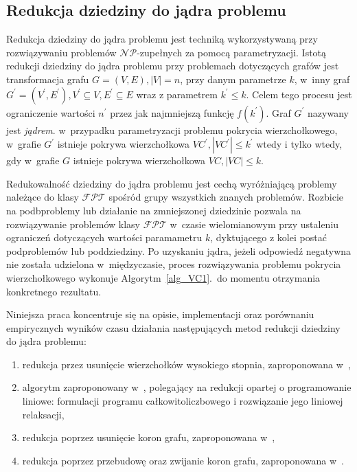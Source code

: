 \subsection{Redukcja dziedziny do jądra problemu}\label{subsection_kernelization}
\par{
  Redukcja dziedziny do jądra problemu jest techniką wykorzystywaną przy
  rozwiązywaniu problemów $\mathcal{NP}$-zupełnych za pomocą parametryzacji.
  Istotą redukcji dziedziny do jądra problemu przy problemach dotyczących grafów
  jest transformacja grafu $G=(V,E), |V|=n$, przy danym parametrze $k$, w~inny
  graf $G^{\prime}=(V^{\prime}, E^{\prime}), V^{\prime} \subseteq V, E^{\prime} \subseteq E$
  wraz z parametrem $k^{\prime} \leq k$.
  Celem tego procesu jest ograniczenie wartości $n^{\prime}$ przez jak najmniejszą
  funkcję $f(k^{\prime})$.
  Graf $G^{\prime}$ nazywany jest \emph{jądrem}.
  w~przypadku parametryzacji problemu pokrycia wierzchołkowego, w~grafie
  $G^{\prime}$ istnieje pokrywa wierzchołkowa $VC^{\prime}, |VC^{\prime}|\leq k^{\prime}$ 
  wtedy i tylko wtedy, gdy w~grafie $G$ istnieje pokrywa wierzchołkowa $VC,
  |VC| \leq k$.
}
\par{
  Redukowalność dziedziny do jądra problemu jest cechą wyróżniającą problemy 
  należące do klasy $\mathcal{FPT}$ spośród grupy wszystkich znanych problemów.
  Rozbicie na podbproblemy lub działanie na zmniejszonej dziedzinie pozwala na
  rozwiązywanie problemów klasy $\mathcal{FPT}$ w~czasie wielomianowym przy
  ustaleniu ograniczeń dotyczących wartości paramametru $k$, dyktującego z kolei
  postać podproblemów lub poddziedziny.
  Po uzyskaniu jądra, jeżeli odpowiedź negatywna nie została udzielona
  w~międzyczasie, proces rozwiązywania problemu pokrycia wierzchołkowego
  wykonuje Algorytm~\ref{alg_VC1}.\ do momentu otrzymania konkretnego
  rezultatu.
}
\par{
  Niniejsza praca koncentruje się na opisie, implementacji oraz porównaniu
  empirycznych wyników czasu działania następujących metod redukcji dziedziny do
  jądra problemu:
  \begin{enumerate}
    \item redukcja przez usunięcie wierzchołków wysokiego stopnia, zaproponowana
      w~\cite{KernelizationAlgorithms04},
    \item algorytm zaproponowany w~\cite{KernelizationAlgorithms04}, polegający
      na redukcji opartej o programowanie liniowe: formulacji programu
      całkowitoliczbowego i rozwiązanie jego liniowej relaksacji,
    \item redukcja poprzez usunięcie koron grafu, zaproponowana
      w~\cite{abukhzam03},
    \item redukcja poprzez przebudowę oraz zwijanie koron grafu, zaproponowana
      w~\cite{ImprovedBounds10}.
  \end{enumerate}
}

